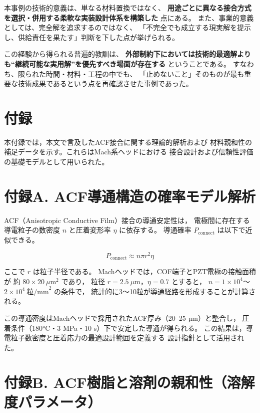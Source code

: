 \documentclass[conference]{IEEEtran}
\begin{document}
本事例の技術的意義は、単なる材料置換ではなく、  
\textbf{用途ごとに異なる接合方式を選択・併用する柔軟な実装設計体系を構築した}  
点にある。  
また、事業的意義としては、完全解を追求するのではなく、  
「不完全でも成立する現実解を提示し、供給責任を果たす」判断を下した点が挙げられる。  

この経験から得られる普遍的教訓は、  
\textbf{外部制約下においては技術的最適解よりも“継続可能な実用解”を優先すべき場面が存在する}  
ということである。  
すなわち、限られた時間・材料・工程の中でも、  
「止めないこと」そのものが最も重要な技術成果であるという点を再確認させた事例であった。

\section*{付録}

本付録では，本文で言及したACF接合に関する理論的解析および
材料親和性の補足データを示す。これらはMach系ヘッドにおける
接合設計および信頼性評価の基礎モデルとして用いられた。

\section*{付録A. ACF導通構造の確率モデル解析}

ACF（Anisotropic Conductive Film）接合の導通安定性は，
電極間に存在する導電粒子の数密度 $n$ と圧着変形率 $\eta$ に依存する。
導通確率 $P_{\text{connect}}$ は以下で近似できる。

\begin{equation}
P_{\text{connect}} \approx n \pi r^2 \eta
\end{equation}

ここで $r$ は粒子半径である。
Machヘッドでは，COF端子とPZT電極の接触面積が
約 $80 \times 20~\mu\text{m}^2$ であり，
粒径 $r = 2.5~\mu$m，$\eta = 0.7$ とすると，
$n = 1\times10^4$〜$2\times10^4~\text{粒/mm}^2$ の条件で，
統計的に3〜10粒が導通経路を形成することが計算される。

この導通密度はMachヘッドで採用されたACF厚み（20–25 µm）と整合し，
圧着条件（180°C・3 MPa・10 s）下で安定した導通が得られる。
この結果は，導電粒子数密度と圧着応力の最適設計範囲を定義する
設計指針として活用された。

\section*{付録B. ACF樹脂と溶剤の親和性（溶解度パラメータ）}
\end{document}
